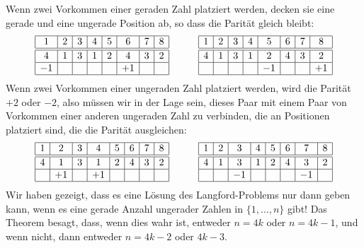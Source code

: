 Wenn zwei Vorkommen einer geraden Zahl platziert werden, decken sie eine gerade und eine ungerade Position ab, so dass die Parität gleich bleibt:
\[
\begin{array}{|c|c|c|c|c|c|c|c|}
\hline
1&2&3&4&5&6&7&8\\
\hline\hline
4&1&3&1&2&4&3&2\\\hline
-1&&&&&+1&&\\\hline
\end{array}
\hspace{3em}
\begin{array}{|c|c|c|c|c|c|c|c|}
\hline
1&2&3&4&5&6&7&8\\
\hline\hline
4&1&3&1&2&4&3&2\\\hline
&&&&-1&&&+1\\\hline
\end{array}
\]
Wenn zwei Vorkommen einer ungeraden Zahl platziert werden, wird die Parität $+2$ oder $-2$, also müssen wir in der Lage sein, dieses Paar mit einem Paar von Vorkommen einer anderen ungeraden Zahl zu verbinden, die an Positionen platziert sind, die die Parität ausgleichen:
\[
\begin{array}{|c|c|c|c|c|c|c|c|}
\hline
1&2&3&4&5&6&7&8\\
\hline\hline
4&1&3&1&2&4&3&2\\\hline
&+1&&+1&&&&\\\hline
\end{array}
\hspace{3em}
\begin{array}{|c|c|c|c|c|c|c|c|}
\hline
1&2&3&4&5&6&7&8\\
\hline\hline
4&1&3&1&2&4&3&2\\\hline
&&-1&&&&-1&\\\hline
\end{array}
\]
Wir haben gezeigt, dass es eine Lösung des Langford-Problems nur dann geben kann, wenn es eine gerade Anzahl ungerader Zahlen in $\{1,\ldots,n\}$ gibt!
Das Theorem besagt, dass, wenn dies wahr ist, entweder $n=4k$ oder $n=4k-1$, und wenn nicht, dann entweder $n=4k-2$ oder $4k-3$.

